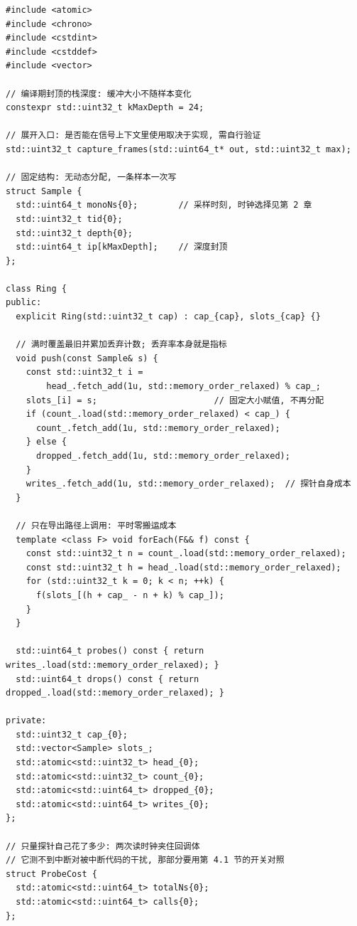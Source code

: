 \documentclass[12pt,a4paper,fontset=fandol]{ctexbook}
\begin{document}
\begin{lstlisting}[style=cppstyle, caption={应用内自采的最小骨架：固定内存环形缓冲与回调自计时（不含实测值；信号上下文的安全性与展开库实现有关，必须实测）}, label={lst:pm14-inproc}]
#include <atomic>
#include <chrono>
#include <cstdint>
#include <cstddef>
#include <vector>

// 编译期封顶的栈深度: 缓冲大小不随样本变化
constexpr std::uint32_t kMaxDepth = 24;

// 展开入口: 是否能在信号上下文里使用取决于实现, 需自行验证
std::uint32_t capture_frames(std::uint64_t* out, std::uint32_t max);

// 固定结构: 无动态分配, 一条样本一次写
struct Sample {
  std::uint64_t monoNs{0};        // 采样时刻, 时钟选择见第 2 章
  std::uint32_t tid{0};
  std::uint32_t depth{0};
  std::uint64_t ip[kMaxDepth];    // 深度封顶
};

class Ring {
public:
  explicit Ring(std::uint32_t cap) : cap_{cap}, slots_{cap} {}

  // 满时覆盖最旧并累加丢弃计数; 丢弃率本身就是指标
  void push(const Sample& s) {
    const std::uint32_t i =
        head_.fetch_add(1u, std::memory_order_relaxed) % cap_;
    slots_[i] = s;                       // 固定大小赋值, 不再分配
    if (count_.load(std::memory_order_relaxed) < cap_) {
      count_.fetch_add(1u, std::memory_order_relaxed);
    } else {
      dropped_.fetch_add(1u, std::memory_order_relaxed);
    }
    writes_.fetch_add(1u, std::memory_order_relaxed);  // 探针自身成本
  }

  // 只在导出路径上调用: 平时零搬运成本
  template <class F> void forEach(F&& f) const {
    const std::uint32_t n = count_.load(std::memory_order_relaxed);
    const std::uint32_t h = head_.load(std::memory_order_relaxed);
    for (std::uint32_t k = 0; k < n; ++k) {
      f(slots_[(h + cap_ - n + k) % cap_]);
    }
  }

  std::uint64_t probes() const { return writes_.load(std::memory_order_relaxed); }
  std::uint64_t drops() const { return dropped_.load(std::memory_order_relaxed); }

private:
  std::uint32_t cap_{0};
  std::vector<Sample> slots_;
  std::atomic<std::uint32_t> head_{0};
  std::atomic<std::uint32_t> count_{0};
  std::atomic<std::uint64_t> dropped_{0};
  std::atomic<std::uint64_t> writes_{0};
};

// 只量探针自己花了多少: 两次读时钟夹住回调体
// 它测不到中断对被中断代码的干扰, 那部分要用第 4.1 节的开关对照
struct ProbeCost {
  std::atomic<std::uint64_t> totalNs{0};
  std::atomic<std::uint64_t> calls{0};
};


\end{lstlisting}
\end{document}
